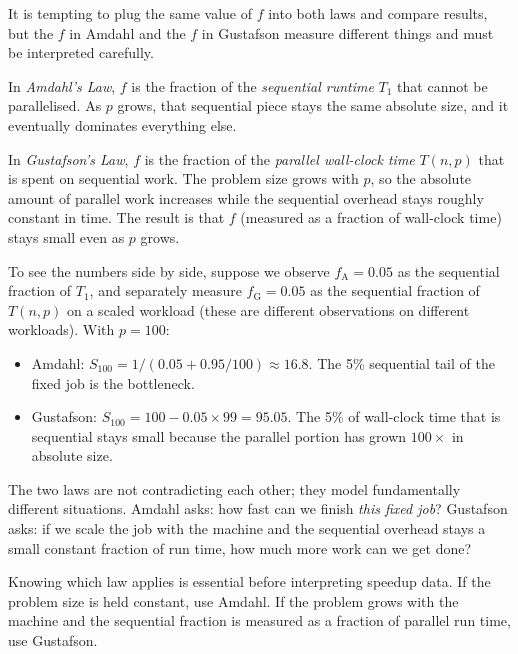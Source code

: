 \begin{ppexample}
It is tempting to plug the same value of $f$ into both laws and compare
results, but the $f$ in Amdahl and the $f$ in Gustafson measure different
things and must be interpreted carefully.

In \emph{Amdahl's Law}, $f$ is the fraction of the \emph{sequential
runtime} $T_1$ that cannot be parallelised.
As $p$ grows, that sequential piece stays the same absolute size, and it
eventually dominates everything else.

In \emph{Gustafson's Law}, $f$ is the fraction of the \emph{parallel
wall-clock time} $T(n,p)$ that is spent on sequential work.
The problem size grows with $p$, so the absolute amount of parallel work
increases while the sequential overhead stays roughly constant in time.
The result is that $f$ (measured as a fraction of wall-clock time) stays
small even as $p$ grows.

To see the numbers side by side, suppose we observe $f_{\mathrm{A}} = 0.05$
as the sequential fraction of $T_1$, and separately measure
$f_{\mathrm{G}} = 0.05$ as the sequential fraction of $T(n,p)$ on a
scaled workload (these are different observations on different workloads).
With $p = 100$:
\begin{itemize}
  \item Amdahl: $S_{100} = 1/(0.05 + 0.95/100) \approx 16.8$.
        The 5\% sequential tail of the fixed job is the bottleneck.
  \item Gustafson: $S_{100} = 100 - 0.05 \times 99 = 95.05$.
        The 5\% of wall-clock time that is sequential stays small because
        the parallel portion has grown $100\times$ in absolute size.
\end{itemize}
The two laws are not contradicting each other; they model fundamentally
different situations.
Amdahl asks: how fast can we finish \emph{this fixed job}?
Gustafson asks: if we scale the job with the machine and the sequential
overhead stays a small constant fraction of run time, how much more work
can we get done?
\end{ppexample}

\begin{ppnote}
Knowing which law applies is essential before interpreting speedup data.
If the problem size is held constant, use Amdahl.
If the problem grows with the machine and the sequential fraction is
measured as a fraction of parallel run time, use Gustafson.
\end{ppnote}

